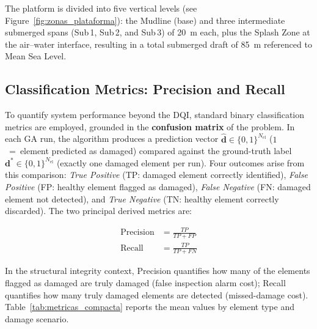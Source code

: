 \documentclass[a4paper,fleqn,nologo]{cas-dc}
\begin{document}
The platform is divided into five vertical levels (see Figure~\ref{fig:zonas_plataforma}): the Mudline (base) and three intermediate submerged spans (Sub\,1, Sub\,2, and Sub\,3) of 20~m each, plus the Splash Zone at the air--water interface, resulting in a total submerged draft of 85~m referenced to Mean Sea Level.

\subsection{Classification Metrics: Precision and Recall}
\label{subsec:metricas_clasificacion}

To quantify system performance beyond the DQI, standard binary classification metrics are
employed, grounded in the \textbf{confusion matrix} of the problem.
In each GA run, the algorithm produces a prediction vector
$\hat{\mathbf{d}} \in \{0,1\}^{N_\text{el}}$ ($1$~=~element predicted as damaged)
compared against the ground-truth label $\mathbf{d}^* \in \{0,1\}^{N_\text{el}}$
(exactly one damaged element per run). Four outcomes arise from this comparison:
\textit{True Positive} (TP: damaged element correctly identified),
\textit{False Positive} (FP: healthy element flagged as damaged),
\textit{False Negative} (FN: damaged element not detected), and
\textit{True Negative} (TN: healthy element correctly discarded).
The two principal derived metrics are:

\begin{align}
    \text{Precision} &= \frac{TP}{TP + FP} \label{eq:precision} \\[4pt]
    \text{Recall}    &= \frac{TP}{TP + FN} \label{eq:recall}
\end{align}

\noindent In the structural integrity context, Precision quantifies how many of the elements flagged as damaged are truly damaged (false inspection alarm cost); Recall quantifies how many truly damaged elements are detected (missed-damage cost).
Table~\ref{tab:metricas_compacta} reports the mean values by element type and damage scenario.

\end{document}
